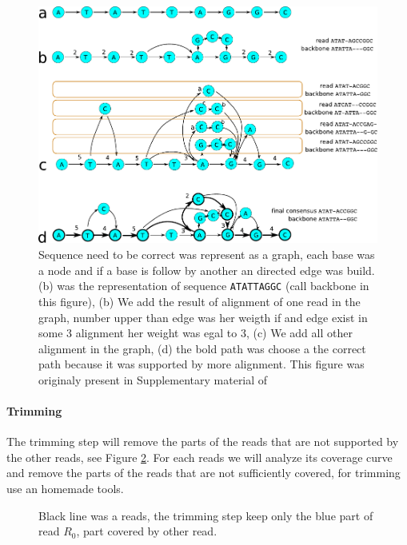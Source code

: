\documentclass[main]{subfiles}
\begin{document}
\begin{figure}[ht]
    \centering
    \includegraphics[width=\textwidth]{state_of_the_art/images/POA_explain.pdf}
    \caption{Sequence need to be correct was represent as a graph, each base was a node and if a base is follow by another an directed edge was build. (b) was the representation of sequence \texttt{ATATTAGGC} (call backbone in this figure), (b) We add the result of alignment of one read in the graph, number upper than edge was her weigth if and edge exist in some 3 alignment her weight was egal to 3, (c) We add all other alignment in the graph, (d) the bold path was choose a the correct path because it was supported by more alignment. This figure was originaly present in Supplementary material of \hgap \cite{hgap}}
    \label{sota:fig:canu:correction}
\end{figure}

\paragraph{Trimming}

The trimming step will remove the parts of the reads that are not supported by the other reads, see Figure \ref{sota:fig:canu:trimming}. For each reads we will analyze its coverage curve and remove the parts of the reads that are not sufficiently covered, for trimming \canu use an homemade tools. 

\begin{figure}[ht]
    \centering
    
    \caption{Black line was a reads, the \canu trimming step keep only the blue part of read $R_0$, part covered by other read.}
    \label{sota:fig:canu:trimming}
\end{figure}
\end{document}
